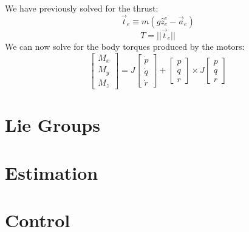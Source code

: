 \documentclass[10pt]{book}
\begin{document}
We have previously solved for the thrust:
%
$$\vec{t}_e \equiv m( g \hat{z}^e_e - \vec{a}_e)$$
%
$$T = ||\vec{t}_e||$$
%
We can now solve for the body torques produced by the motors:
%
$$\begin{bmatrix}M_x \\ M_y \\ M_z \end{bmatrix} = J \begin{bmatrix}
\dot{p} \\ \dot{q} \\ \dot{r}
\end{bmatrix} + \begin{bmatrix}p \\ q \\ r\end{bmatrix} \times J \begin{bmatrix}p \\ q \\ r\end{bmatrix}$$

\chapter{Lie Groups}

\chapter{Estimation}

\chapter{Control}

\end{document}
